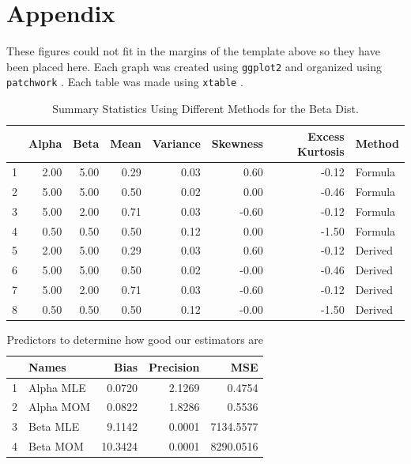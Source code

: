 \documentclass{article}\usepackage[]{graphicx}\usepackage[]{xcolor}
\begin{document}
\newpage
\onecolumn
\section{Appendix}


These figures could not fit in the margins of the template above so they have been placed here. Each graph was created using \texttt{ggplot2} and organized using \texttt{patchwork} \citep{ggplot} \citep{patchwork}. Each table was made using \texttt{xtable} \citep{xtable}. 



\begin{table}[ht]
\centering
\begin{tabular}{rrrrrrrl}
\hline
& Alpha & Beta & Mean & Variance & Skewness & Excess Kurtosis & Method \\ 
\hline
1 & 2.00 & 5.00 & 0.29 & 0.03 & 0.60 & -0.12 & Formula \\ 
2 & 5.00 & 5.00 & 0.50 & 0.02 & 0.00 & -0.46 & Formula \\ 
3 & 5.00 & 2.00 & 0.71 & 0.03 & -0.60 & -0.12 & Formula \\ 
4 & 0.50 & 0.50 & 0.50 & 0.12 & 0.00 & -1.50 & Formula \\ 
5 & 2.00 & 5.00 & 0.29 & 0.03 & 0.60 & -0.12 & Derived \\ 
6 & 5.00 & 5.00 & 0.50 & 0.02 & -0.00 & -0.46 & Derived \\ 
7 & 5.00 & 2.00 & 0.71 & 0.03 & -0.60 & -0.12 & Derived \\ 
8 & 0.50 & 0.50 & 0.50 & 0.12 & -0.00 & -1.50 & Derived \\ 
\hline
\end{tabular}
\caption{Summary Statistics Using Different Methods for the Beta Dist.}
\label{Table 1}
\end{table}


\begin{table}[ht]
\centering
\begin{tabular}{rlrrr}
  \hline
 & Names & Bias & Precision & MSE \\ 
  \hline
1 & Alpha MLE & 0.0720 & 2.1269 & 0.4754 \\ 
  2 & Alpha MOM & 0.0822 & 1.8286 & 0.5536 \\ 
  3 & Beta MLE & 9.1142 & 0.0001 & 7134.5577 \\ 
  4 & Beta MOM & 10.3424 & 0.0001 & 8290.0516 \\ 
   \hline
\end{tabular}
\caption{Predictors to determine how good our estimators are}
\label{Table 2}
\end{table}
\end{document}
